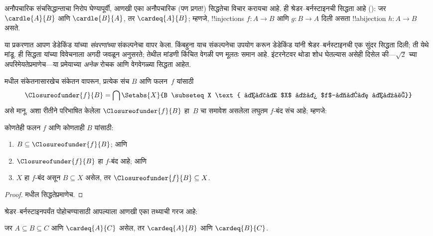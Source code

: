 \documentclass[../../../include/open-logic-section]{subfiles}
\begin{document}


अनौपचारिक संचसिद्धान्ताचा निरोप घेण्यापूर्वी, आणखी एका अनौपचारिक
(पण प्रगत!) सिद्धतेचा विचार करायचा आहे. ही श्रेडर--बर्नस्टाइनची सिद्धता
आहे (): जर
$\cardle{A}{B}$ आणि $\cardle{B}{A}$, तर $\cardeq{A}{B}$; म्हणजे,
!!{injection}s $f \colon A \to B$ आणि $g \colon B \to A$ दिली असता
!!a{bijection} $h \colon A \to B$ असते.

या प्रकरणात आपण डेडेकिंड यांच्या \emph{संवरणांच्या} संकल्पनेचा वापर
केला. किंबहुना याच संकल्पनेचा उपयोग करून डेडेकिंड यांनी
श्रेडर--बर्नस्टाइनची एक सुंदर सिद्धता दिली; ती येथे मांडू. ही सिद्धता
\citet[pp.~157--8]{Potter2004} यांच्या विवेचनाला अगदी जवळून अनुसरते;
तेथील मांडणी किंचित वेगळी पण मूलतः समान आहे. इंटरनेटवर थोडा शोध
घेतल्यास असेही दिसेल की---$\sqrt{2}$ च्या अपरिमेयतेप्रमाणेच---या
प्रमेयाच्या \emph{अनेक} रोचक आणि वेगवेगळ्या सिद्धता आहेत.

 मधील संकेतनासारखेच संकेतन
वापरून, प्रत्येक संच $B$ आणि फलन~$f$ यांसाठी
\[
\Closureofunder{f}{B} = \bigcap \Setabs{X}{B \subseteq X
\text{ आणि $X$ हा $f$-बंद आहे}}
\]
असे मानू. अशा रीतीने परिभाषित केलेला $\Closureofunder{f}{B}$ हा~$B$
चा समावेश असलेला लघुतम $f$-बंद संच आहे; म्हणजे:

\begin{lem}
	कोणतेही फलन $f$ आणि कोणताही $B$ यांसाठी:
	\begin{enumerate}
		\item{} $B \subseteq \Closureofunder{f}{B}$; आणि
		\item{} $\Closureofunder{f}{B}$ हा $f$-बंद आहे; आणि
		\item{} $X$ हा $f$-बंद असून $B
		\subseteq X$ असेल, तर $\Closureofunder{f}{B} \subseteq X$.
	\end{enumerate}
\end{lem}

\begin{proof}
 मधील सिद्धतेप्रमाणेच.
\end{proof}

श्रेडर--बर्नस्टाइनपर्यंत पोहोचण्यासाठी आपल्याला आणखी एका तथ्याची गरज आहे:

\begin{prop}
जर $A \subseteq B \subseteq C$ आणि $\cardeq{A}{C}$ असेल, तर
$\cardeq{A}{B}$ आणि $\cardeq{B}{C}$.
\end{prop}
\end{document}
